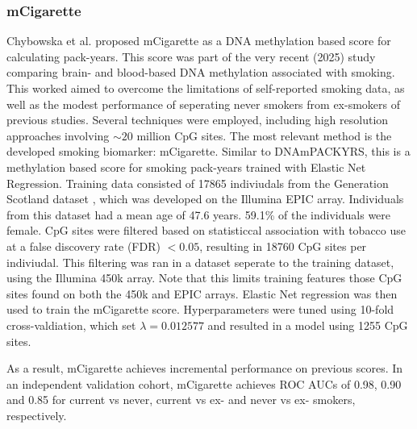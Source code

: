\documentclass{article}
\begin{document}

\subsubsection{mCigarette} \label{sec:mcigarette}
Chybowska et al. \cite{chybowska2025blood} proposed mCigarette as a DNA methylation based score for calculating pack-years. This score was part of the very recent (2025) study comparing brain- and blood-based DNA methylation associated with smoking. This worked aimed to overcome the limitations of self-reported smoking data, as well as the modest performance of seperating never smokers from ex-smokers of previous studies. Several techniques were employed, including high resolution approaches involving \(\sim \! 20\) million CpG sites. The most relevant method is the developed smoking biomarker: mCigarette. Similar to DNAmPACKYRS, this is a methylation based score for smoking pack-years trained with Elastic Net Regression. Training data consisted of \num{17865} indiviudals from the Generation Scotland dataset \cite{smith2006generation}, which was developed on the Illumina EPIC array. Individuals from this dataset had a mean age of 47.6 years. 59.1\% of the individuals were female. CpG sites were filtered based on statisticcal association with tobacco use at a false discovery rate (FDR) \(< 0.05\), resulting in \num{18760} CpG sites per indiviudal. This filtering was ran in a dataset seperate to the training dataset, using the Illumina 450k array. Note that this limits training features those CpG sites found on both the 450k and EPIC arrays. Elastic Net regression was then used to train the mCigarette score. Hyperparameters were tuned using 10-fold cross-valdiation, which set \(\lambda = 0.012577\) and resulted in a model using \num{1255} CpG sites.

As a result, mCigarette achieves incremental performance on previous scores. In an independent validation cohort, mCigarette achieves ROC AUCs of 0.98, 0.90 and 0.85 for current vs never, current vs ex- and never vs ex- smokers, respectively.

\end{document}
